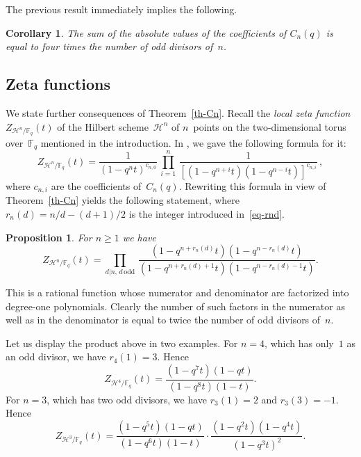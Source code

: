 \documentclass[11pt, a4paper]{amsart}
\newtheorem{prop}[theorem]{Proposition}
\newtheorem{coro}[theorem]{Corollary}
\theoremstyle{definition}
\newcommand\HH{\mathcal H}
\newcommand\FF{\mathbb{F}}
\numberwithin{equation}{section}
\begin{document}
The previous result immediately implies the following.

\begin{coro}\label{coro-vacni} 
The sum of the absolute values of the coefficients of $C_n(q)$ is equal to four times the number of odd divisors of~$n$.
\end{coro}


\subsection{Zeta functions}\label{ssec-zeta}

We state further consequences of Theorem~\ref{th-Cn}. 
Recall the \emph{local zeta function}~$Z_{\HH^n/\FF_q}(t)$ 
of the Hilbert scheme~$\HH^n$ of $n$~points on the two-dimensional torus
over~$\FF_q$ mentioned in the introduction. 
In \cite[Th.~2.1]{KR3}, we gave the following formula for it: 
\[
Z_{\HH^n/\FF_q}(t) = \frac{1}{(1-q^nt)^{c_{n,0}}} \, \prod_{i=1}^n \, \frac{1}{[(1-q^{n+i}t)(1-q^{n-i}t)]^{c_{n,i}}} \, ,
\]
where $c_{n,i}$ are the coefficients of~$C_n(q)$.
Rewriting this formula in view of Theorem~\ref{th-Cn} yields the following statement, where $r_n(d) = n/d - (d+1)/2$
is the integer introduced in~\eqref{eq-rnd}.

\begin{prop}\label{prop-zeta}
For $n\geq 1$ we have
\begin{equation*}
Z_{\HH^n/\FF_q}(t) 
= \prod_{d | n , \, d \, \mathrm{odd}} \, 
\frac{(1-q^{n + r_n(d)}t)(1-q^{n - r_n(d)}t)}{(1-q^{n + r_n(d)+1}t)(1-q^{n - r_n(d)-1}t)} .
\end{equation*}
\end{prop}

This is a rational function whose numerator and denominator are factorized into degree-one polynomials.
Clearly the number of such factors in the numerator as well as in the denominator is equal to twice
the number of odd divisors of~$n$.

Let us display the product above in two examples. 
For $n=4$, which has only~$1$ as an odd divisor, we have $r_4(1) = 3$. Hence
\begin{equation*}
Z_{\HH^4/\FF_q}(t)  = \frac{(1-q^{7}t)(1-qt)}{(1-q^{8}t)(1-t)} .
\end{equation*}
For $n=3$, which has two odd divisors, we have $r_3(1) = 2$ and $r_3(3) = -1$. Hence
\begin{equation*}
Z_{\HH^3/\FF_q}(t)  = \frac{(1-q^{5}t)(1-qt)}{(1-q^{6}t)(1-t)} \cdot \frac{(1-q^{2}t)(1-q^4t)}{(1-q^{3}t)^2} .
\end{equation*}
\end{document}

